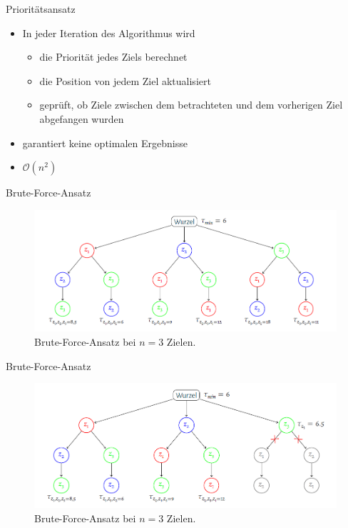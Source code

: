 \documentclass[10pt,table,xcolor=dvipsnames]{beamer}
\begin{document}
\begin{frame}{Prioritätsansatz}
\begin{itemize}
\item
In jeder Iteration des Algorithmus wird
\begin{itemize}
\item
die Priorität jedes Ziels berechnet
\item
die Position von jedem Ziel aktualisiert
\item
geprüft, ob Ziele zwischen dem betrachteten und dem vorherigen Ziel abgefangen wurden
\end{itemize}
\pause
\item
garantiert keine optimalen Ergebnisse
\pause
\item
$\mathcal{O}(n^2)$
\end{itemize}
\end{frame}

\begin{frame}{Brute-Force-Ansatz}
\begin{figure}
\centering
\includegraphics[scale=0.3]{Images/BF1.png}
\caption{Brute-Force-Ansatz bei $n=3$ Zielen.}
\end{figure}
\end{frame}

\begin{frame}[noframenumbering]{Brute-Force-Ansatz}
\begin{figure}
\centering
\includegraphics[scale=0.3]{Images/BF2.png}
\caption{Brute-Force-Ansatz bei $n=3$ Zielen.}
\end{figure}
\end{frame}
\end{document}
